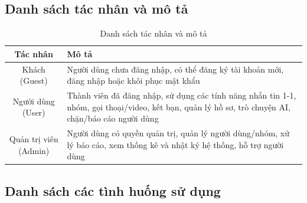 \documentclass[12pt,a4paper]{report}
\begin{document}
\subsection{Danh sách tác nhân và mô tả}

\begin{table}[H]
    \centering
    \caption{Danh sách tác nhân và mô tả}
    \begin{tabularx}{\textwidth}{|c|X|}
        \hline
        \textbf{Tác nhân} & \textbf{Mô tả} \\
        \hline
        Khách (Guest) & Người dùng chưa đăng nhập, có thể đăng ký tài khoản mới, đăng nhập hoặc khôi phục mật khẩu \\
        \hline
        Người dùng (User) & Thành viên đã đăng nhập, sử dụng các tính năng nhắn tin 1-1, nhóm, gọi thoại/video, kết bạn, quản lý hồ sơ, trò chuyện AI, chặn/báo cáo người dùng \\
        \hline
        Quản trị viên (Admin) & Người dùng có quyền quản trị, quản lý người dùng/nhóm, xử lý báo cáo, xem thống kê và nhật ký hệ thống, hỗ trợ người dùng \\
        \hline
    \end{tabularx}
\end{table}

\subsection{Danh sách các tình huống sử dụng}
\end{document}
